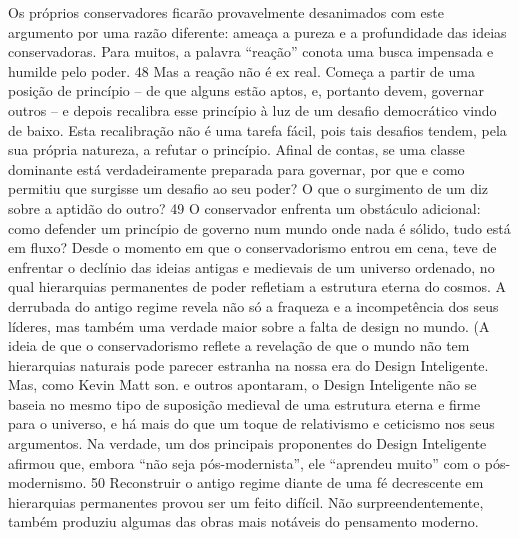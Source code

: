 Os próprios conservadores ficarão provavelmente desanimados com este argumento por uma razão diferente: ameaça a pureza e a profundidade das ideias conservadoras. Para muitos, a palavra “reação” conota uma busca impensada e humilde pelo poder.
 {\color{blue} 48}  
Mas a reação não é ex real. Começa a partir de uma posição de princípio – de que alguns estão aptos, e, portanto devem, governar outros – e depois recalibra esse princípio à luz de um desafio democrático vindo de baixo. Esta recalibração não é uma tarefa fácil, pois tais desafios tendem, pela sua própria natureza, a refutar o princípio. Afinal de contas, se uma classe dominante está verdadeiramente preparada para governar, por que e como permitiu que surgisse um desafio ao seu poder? O que o surgimento de um diz sobre a aptidão do outro?
 {\color{blue} 49}  
O conservador enfrenta um obstáculo adicional: como defender um princípio de governo num mundo onde nada é sólido, tudo está em fluxo? Desde o momento em que o conservadorismo entrou em cena, teve de enfrentar o declínio das ideias antigas e medievais de um universo ordenado, no qual hierarquias permanentes de poder refletiam a estrutura eterna do cosmos. A derrubada do antigo regime revela não só a fraqueza e a incompetência dos seus líderes, mas também uma verdade maior sobre a falta de design no mundo. (A ideia de que o conservadorismo reflete a revelação de que o mundo não tem hierarquias naturais pode parecer estranha na nossa era do Design Inteligente. Mas, como Kevin Matt son. e outros apontaram, o Design Inteligente não se baseia no mesmo tipo de suposição medieval de uma estrutura eterna e firme para o universo, e há mais do que um toque de relativismo e ceticismo nos seus argumentos. Na verdade, um dos principais proponentes do Design Inteligente afirmou que, embora “não seja pós-modernista”, ele “aprendeu muito” com o pós-modernismo.
 {\color{blue} 50}  
 Reconstruir o antigo regime diante de uma fé decrescente em hierarquias permanentes provou ser um feito difícil. Não surpreendentemente, também produziu algumas das obras mais notáveis ​​do pensamento moderno.
 
\par
 
